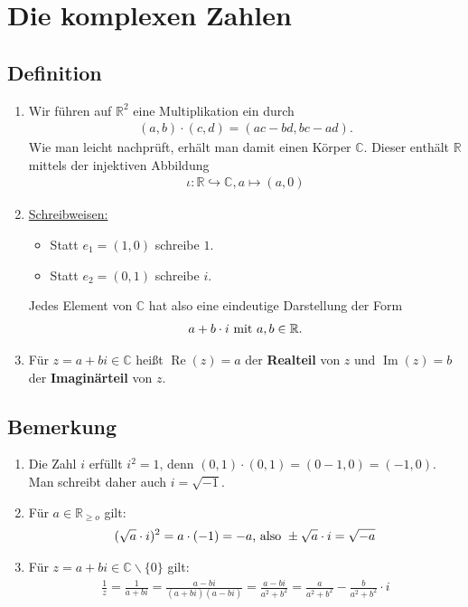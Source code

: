 \section{Die komplexen Zahlen}

\subsection{Definition}

	\begin{enumerate}
	\item Wir führen auf $\mathbb{R}^2$ eine Multiplikation ein durch
	\begin{align*}
	(a,b)\cdot (c,d) = (ac-bd, bc-ad).
	\end{align*}
	Wie man leicht nachprüft, erhält man damit einen Körper $\mathbb{C}$. Dieser enthält $\mathbb{R}$ mittels der 
	injektiven Abbildung
	\begin{align*}
	\iota: \mathbb{R} \hookrightarrow \mathbb{C}, a\mapsto (a,0)
	\end{align*}
	
	\item \underline{Schreibweisen:}
		\begin{itemize}
		\item Statt $e_1=(1,0)$ schreibe $1$.
		\item Statt $e_2=(0,1)$ schreibe $i$.
		\end{itemize}
		Jedes Element von $\mathbb{C}$ hat also eine eindeutige Darstellung der Form
		\begin{align*}
		a+b\cdot i \textnormal{ mit } a,b \in \mathbb{R}.
		\end{align*}
		
	\item Für $z=a+bi \in \mathbb{C}$ heißt $\operatorname{Re}(z)=a$ der \textbf{Realteil} von $z$ 
	und $\operatorname{Im}(z)=b$ der \textbf{Imaginärteil} von $z$.
	
	\end{enumerate}
	
	
\subsection{Bemerkung}

	\begin{enumerate}
	\item Die Zahl $i$ erfüllt $i^2 = 1$, denn $(0,1)\cdot (0,1)=(0-1,0)=(-1,0).$\\
	Man schreibt daher auch $i=\sqrt{-1}$.
	
	\item Für $a\in \mathbb{R}_{\geq o}$ gilt:
	\begin{align*}
	(\sqrt{a}\cdot i)^2=a\cdot (-1)=-a \textnormal{, also } \pm\sqrt{a}\cdot i = \sqrt{-a}
	\end{align*}
	
	\item Für $z=a+bi \in \mathbb{C}\backslash \{0\}$ gilt:
	\begin{align*}
	\frac{1}{z}=\frac{1}{a+bi}=\frac{a-bi}{(a+bi)(a-bi)}=\frac{a-bi}{a^2+b^2}=
	\frac{a}{a^2+b^2}-\frac{b}{a^2+b^2}\cdot i
	\end{align*}
	\end{enumerate}
	
